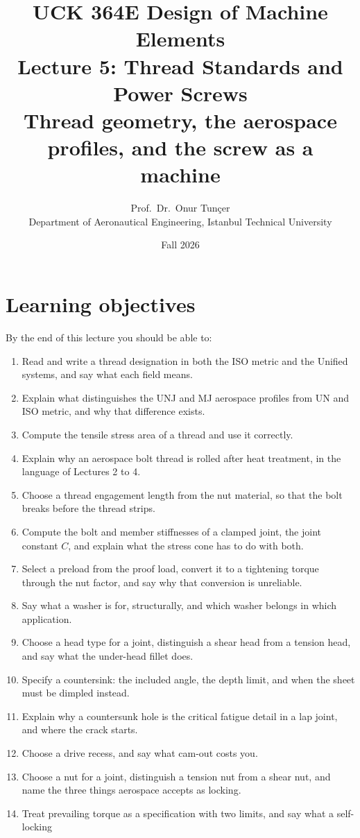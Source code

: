 \documentclass[11pt,a4paper]{article}
\title{\textbf{UCK 364E Design of Machine Elements}\\[4pt]
\Large Lecture 5: Thread Standards and Power Screws\\[2pt]
\large Thread geometry, the aerospace profiles, and the screw as a machine}
\author{Prof.\ Dr.\ Onur Tunçer\\ Department of Aeronautical Engineering, Istanbul Technical University}
\date{Fall 2026}
\begin{document}
\maketitle

\section*{Learning objectives}
By the end of this lecture you should be able to:
\begin{enumerate}[nosep]
  \item Read and write a thread designation in both the ISO metric and the Unified systems, and say what each field means.
  \item Explain what distinguishes the UNJ and MJ aerospace profiles from UN and ISO metric, and why that difference exists.
  \item Compute the tensile stress area of a thread and use it correctly.
  \item Explain why an aerospace bolt thread is rolled after heat treatment, in the language of Lectures 2 to 4.
  \item Choose a thread engagement length from the nut material, so that the bolt breaks before the thread strips.
  \item Compute the bolt and member stiffnesses of a clamped joint, the joint constant $C$, and explain what the stress cone has to do with both.
  \item Select a preload from the proof load, convert it to a tightening torque through the nut factor, and say why that conversion is unreliable.
  \item Say what a washer is for, structurally, and which washer belongs in which application.
  \item Choose a head type for a joint, distinguish a shear head from a tension head, and say what the under-head fillet does.
  \item Specify a countersink: the included angle, the depth limit, and when the sheet must be dimpled instead.
  \item Explain why a countersunk hole is the critical fatigue detail in a lap joint, and where the crack starts.
  \item Choose a drive recess, and say what cam-out costs you.
  \item Choose a nut for a joint, distinguish a tension nut from a shear nut, and name the three
        things aerospace accepts as locking.
  \item Treat prevailing torque as a specification with two limits, and say what a self-locking

\end{enumerate}
\end{document}
